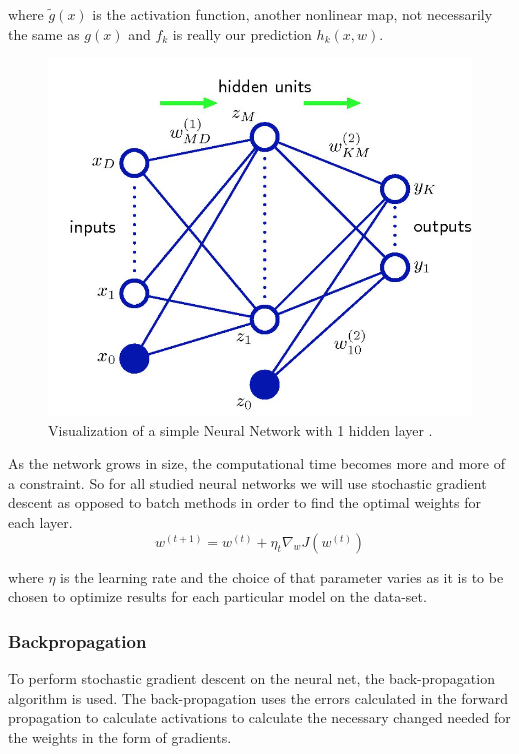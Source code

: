 \documentclass[12pt, twocolumn]{article}
\begin{document}
where $\tilde{g}(x)$ is the activation function, another nonlinear map, not necessarily the same as $g(x)$ and $f_k$ is really our prediction $h_k(x,w)$. 

\begin{figure}
\includegraphics[scale=.6]{simpleNN.png}

\caption{Visualization of a simple Neural Network with 1 hidden layer \cite{Bishop} . }
\label{fig:basicNN}
\end{figure}



As the network grows in size, the computational time becomes more and more of a constraint. So for all studied neural networks we will use stochastic gradient descent as opposed to batch methods in order to find the optimal weights for each layer. 
\begin{equation}
w^{(t+1)} = w^{(t)} + \eta_t \nabla_w J(w^{(t)})
\end{equation}

where $\eta$ is  the learning rate and the choice of that parameter varies as it is to be chosen to optimize results for each particular model on the data-set.


\subsubsection{Backpropagation}

To perform stochastic gradient descent on the neural net, the back-propagation algorithm is used. The back-propagation uses the errors calculated in the forward propagation to calculate activations to calculate the necessary changed needed for the weights in the form of gradients. 
\end{document}
